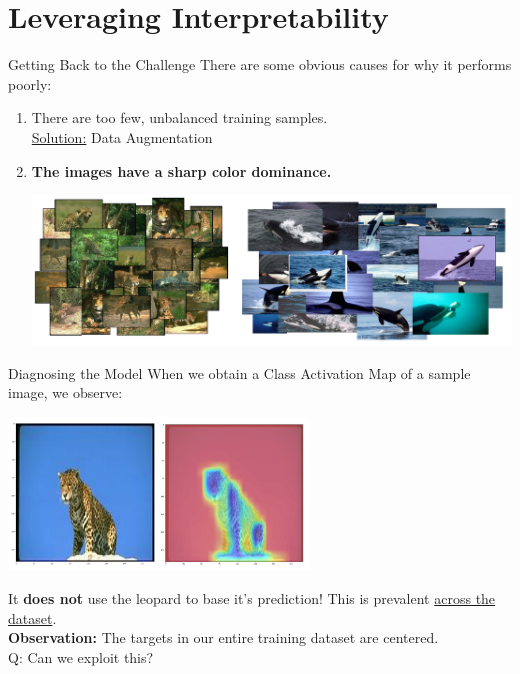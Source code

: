\documentclass{beamer}
\begin{document}
\section{Leveraging Interpretability}
\begin{frame}{Getting Back to the Challenge}
	There are some obvious causes for why it performs poorly:
	\begin{enumerate}[label=\alph*.]
		\item There are too few, unbalanced training samples. \pause \\
			\underline{Solution:} Data Augmentation \pause
		\item \textbf{The images have a sharp color dominance.} \pause
			\begin{center}
				\vspace{-1em}
				\hspace*{-2em}  
				\includegraphics[width=\textwidth]{img/dataset.pdf}
			\end{center}
	\end{enumerate}
\end{frame}

\begin{frame}{Diagnosing the Model}
	When we obtain a Class Activation Map of a sample image, we observe:
	\begin{center}
		\vspace{-.8em}
		\includegraphics[width=8cm]{img/bad-cam}
	\end{center} \pause
	\vspace{-1em}
	It \textbf{does not} use the leopard to base it's prediction!
	This is prevalent \underline{across the dataset}. \pause \newline \\

	\textbf{Observation:} The targets in our entire training dataset are centered. \pause \newline \\

	Q: Can we exploit this?
\end{frame}
\end{document}
